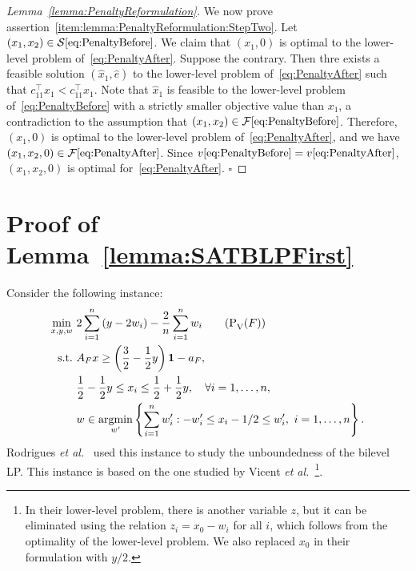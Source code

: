 \documentclass[runningheads,orivec]{llncs}
\newcommand{\EtAl}{\textit{et al.}}
\newcommand{\MacroColor}[1]{#1}
\newcommand{\MyQED}{\mbox{}\hfill$\square$}
\DeclareMathOperator*{\Argmin}{\MacroColor{argmin}}
\newcommand{\OneVector}{\mathbf{1}}
\newcommand{\NVariables}{\MacroColor{n}}
\newcommand{\OptValFunc}{\MacroColor{v}}
\newcommand{\OptSolSet}{\MacroColor{\mathcal{S}}}
\newcommand{\FeasSolSet}{\MacroColor{\mathcal{F}}}
\newcommand{\SATBooleanFormula}{\MacroColor{F}}
\newcommand{\ReformFrac}{\MacroColor{w}}
\begin{document}
\begin{appendix}
\begin{proof}[Lemma~\ref{lemma:PenaltyReformulation}]
We now prove assertion~\ref{item:lemma:PenaltyReformulation:StepTwo}.
Let $(x_1, x_2) \in \OptSolSet\eqref{eq:PenaltyBefore}$.
We claim that $(x_1, 0)$ is optimal to the lower-level problem of~\eqref{eq:PenaltyAfter}.
Suppose the contrary.
Then thre exists a feasible solution $(\hat{x}_1, \hat{e})$ to the lower-level problem of~\eqref{eq:PenaltyAfter} such that $c_{1 1}^{\top} \hat{x}_1 < c_{1 1}^{\top} x_1$.
Note that $\hat{x}_1$ is feasible to the lower-level problem of~\eqref{eq:PenaltyBefore} with a strictly smaller objective value than $x_1$, a contradiction to the assumption that $(x_1, x_2) \in \FeasSolSet\eqref{eq:PenaltyBefore}$.
Therefore, $(x_1, 0)$ is optimal to the lower-level problem of~\eqref{eq:PenaltyAfter}, and we have $(x_1, x_2, 0) \in \FeasSolSet\eqref{eq:PenaltyAfter}$.
Since $\OptValFunc\eqref{eq:PenaltyBefore} = \OptValFunc\eqref{eq:PenaltyAfter}$, $(x_1, x_2, 0)$ is optimal for~\eqref{eq:PenaltyAfter}.
\MyQED
\end{proof}

\section{Proof of Lemma~\ref{lemma:SATBLPFirst}}
\label{sec:proof_of_lemma_sat_multivariate_blp_formulation}

Consider the following instance:
\begin{align}
\min_{x, y, \ReformFrac} \ & 2\sum_{i = 1}^{n} \left(y - 2 \ReformFrac_i \right) - \frac{2}{n} \sum_{i = 1}^n \ReformFrac_i
\tag{P${}_{\text{V}}^{\text{}}(\SATBooleanFormula)$}
\label{eq:SATBLPFirstVicent}
\\
\text{s.t.} \ &
A_{\SATBooleanFormula} x \ge \left(\frac{3}{2} - \frac{1}{2} y\right) \OneVector - a_{\SATBooleanFormula}, \label{eq:SATBLPFirstVicentConstraintOne} \\
&
\frac{1}{2} - \frac{1}{2} y \le x_{i} \le \frac{1}{2} + \frac{1}{2} y, \quad \forall i = 1, \ldots, \NVariables,
\label{eq:SATBLPFirstVicentConstraintTwo} \\
&
\ReformFrac \in \Argmin_{\ReformFrac'} 
\left\{ 
\sum_{i = 1}^n \ReformFrac_i'
:
-\ReformFrac_i' \le x_i - 1/2 \le \ReformFrac_i', \ i = 1, \ldots, n 
\right\}. \notag 
\end{align}
Rodrigues \EtAl{}~\cite{RodriguesEtAl2024} used this instance to study the unboundedness of the bilevel LP.
This instance is based on the one studied by Vicent \EtAl{}~\cite{vicente1994descent}\footnote{In their lower-level problem, there is another variable $z$, but it can be eliminated using the relation $z_i = x_0 - w_i$ for all $i$, which follows from the optimality of the lower-level problem. We also replaced $x_0$ in their formulation with $y / 2$.}.


\end{appendix}
\end{document}
